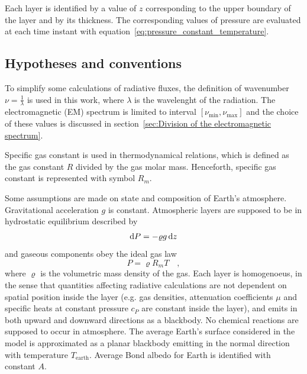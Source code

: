 \documentclass[a4paper,10pt,twocolumn,\classoptions]{article}
\begin{document}
Each layer is identified by a value of $z$ corresponding to the upper boundary of the layer and by its thickness. The corresponding values of pressure are evaluated at each time instant with equation~\eqref{eq:pressure_constant_temperature}.



\subsection{Hypotheses and conventions}
\label{sec:Hypotheses and conventions}
To simplify some calculations of radiative fluxes,
the definition of wavenumber $\nu = \frac{1}{\lambda}$ is used in this work, where $\lambda$ is the wavelenght of the radiation. The electromagnetic (EM) spectrum is limited to interval $[\nu_\text{min}, \nu_\text{max}]$ and the choice of these values is discussed in section~\ref{sec:Division of the electromagnetic spectrum}.

Specific gas constant is used in thermodynamical relations, which is defined as the gas constant $R$ divided by the gas molar mass. Henceforth, specific gas constant is represented with symbol $R_m$.

Some assumptions are made on state and composition of Earth's atmosphere. Gravitational acceleration $g$ is constant. Atmospheric layers are supposed to be in hydrostatic equilibrium described by
\begin{equation}
  \label{eq:hydrostatic_equilibrium}
  \odif{P} = - \varrho g \odif{z}
\end{equation}
and gaseous components obey the ideal gas law
\begin{equation}
  \label{eq:ideal_gas_law}
  P = \varrho R_m T
  \quad ,
\end{equation}
where $\varrho$ is the volumetric mass density of the gas.
Each layer is homogenoeus, in the sense that quantities affecting radiative calculations are not dependent on spatial position inside the layer (e.g. gas densities, attenuation coefficients $\mu$ and specific heats at constant pressure $c_P$ are constant inside the layer), and emits in both upward and downward directions as a blackbody. No chemical reactions are supposed to occur in atmosphere.
The average Earth's surface considered in the model is approximated as a planar blackbody emitting in the normal direction with temperature $T_\text{earth}$. Average Bond albedo for Earth is identified with constant $A$.
\end{document}
